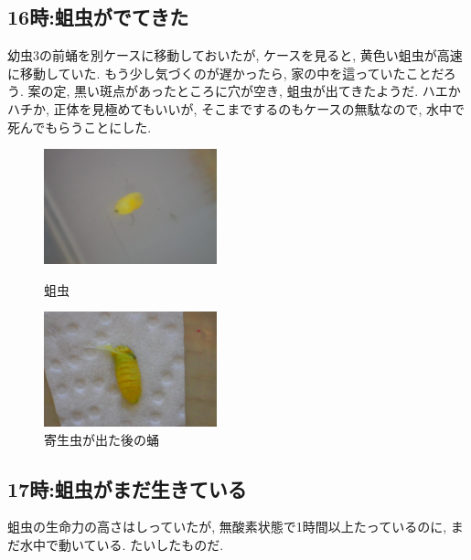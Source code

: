 \documentclass{jsarticle}
\begin{document}
\subsection{16時:蛆虫がでてきた}
幼虫3の前蛹を別ケースに移動しておいたが, ケースを見ると, 黄色い蛆虫が高速に移動していた. 
もう少し気づくのが遅かったら, 家の中を這っていたことだろう. 
案の定, 黒い斑点があったところに穴が空き, 蛆虫が出てきたようだ. 
ハエかハチか, 正体を見極めてもいいが, そこまでするのもケースの無駄なので, 水中で死んでもらうことにした. 
\begin{figure}[htbp]
  \begin{minipage}{0.5\hsize}
    \begin{center}
      \includegraphics[width=5cm]{photo4/maggot.JPG}
    \end{center}
    \caption{蛆虫}
  \end{minipage}
  \begin{minipage}{0.5\hsize}
    \begin{center}
      \includegraphics[width=5cm]{photo4/pupaDead.JPG}
    \end{center}
    \caption{寄生虫が出た後の蛹}
  \end{minipage}
\end{figure}

\subsection{17時:蛆虫がまだ生きている}
蛆虫の生命力の高さはしっていたが, 無酸素状態で1時間以上たっているのに, まだ水中で動いている. 
たいしたものだ. 
\end{document}
